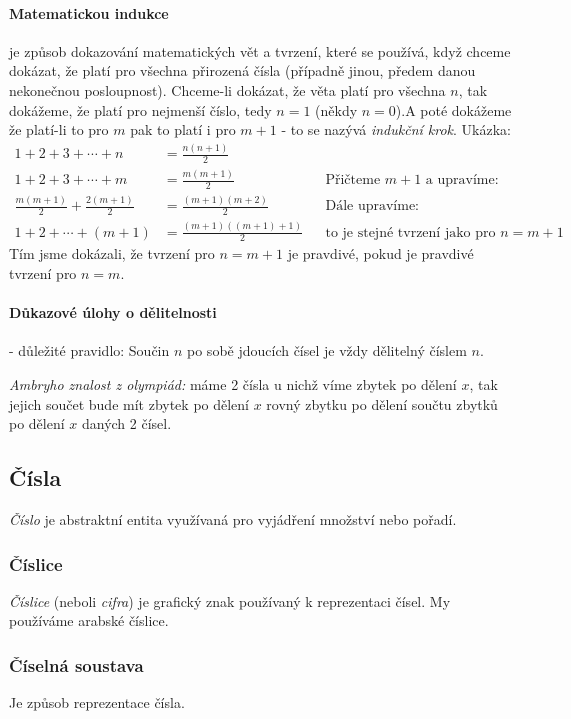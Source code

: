 \documentclass[12pt]{article}
\begin{document}
\paragraph{Matematickou indukce} je způsob dokazování matematických vět a tvrzení, které se používá, když chceme dokázat, že platí pro všechna přirozená čísla (případně jinou, předem danou nekonečnou posloupnost). Chceme-li dokázat, že věta platí pro všechna $n$, tak dokážeme, že platí pro nejmenší číslo, tedy $n=1$ (někdy $n=0$).A poté dokážeme že platí-li to pro $m$ pak to platí i pro $m+1$ -  to se nazývá \emph{indukční krok}. Ukázka:
\begin{align*}
1 + 2 +3 + \dotsb + n &= \frac{n(n+1)}{2}\\
1 + 2 +3 + \dotsb + m &= \frac{m(m+1)}{2} && \text{Přičteme $m+1$ a upravíme:}\\
\frac{m(m+1)}{2} + \frac{2(m+1)}{2} &= \frac{(m+1)(m+2)}{2} && \text{Dále upravíme:}\\
1 +2 + \dotsb + (m+1) &= \frac{(m+1)((m+1)+1)}{2} && \text{to je stejné tvrzení jako pro  $n =m+1$}
\end{align*}
Tím jsme dokázali, že tvrzení pro $n = m+1$ je pravdivé, pokud je pravdivé tvrzení pro $n=m$.
\paragraph{Důkazové úlohy o dělitelnosti} - důležité pravidlo: Součin $n$ po sobě jdoucích čísel je vždy dělitelný číslem $n$.\\
\begin{scriptsize}
\emph{Ambryho znalost z olympiád:} máme 2 čísla u nichž víme zbytek po dělení $x$, tak jejich součet bude mít zbytek po dělení $x$ rovný zbytku po dělení součtu zbytků po dělení $x$ daných 2 čísel.
\end{scriptsize}
\subsection{Čísla}
\emph{Číslo} je abstraktní entita využívaná pro vyjádření množství nebo pořadí.
\subsubsection{Číslice}
\emph{Číslice} (neboli \emph{cifra}) je grafický znak používaný k reprezentaci čísel. My používáme arabské číslice.
\subsubsection{Číselná soustava}
Je způsob reprezentace čísla.
\end{document}
